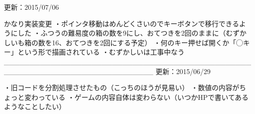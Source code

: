 更新：2015/07/06

かなり実装変更
・ポインタ移動はめんどくさいのでキーボタンで移行できるようにした
・ふつうの難易度の箱の数を9にし、おてつきを2回のままに（むずかしいも箱の数を16、おてつきを2回にする予定）
・何のキー押せば開くか「◯キー」という形で描画されている
・むずかしいは工事中なう
_____________________________________________________________________________
更新：2015/06/29

・旧コードを分割処理させたもの（こっちのほうが見易い）
・数値の内容がちょっと変わっている
・ゲームの内容自体は変わらない（いつかHPで書いてあるようなことしたい）